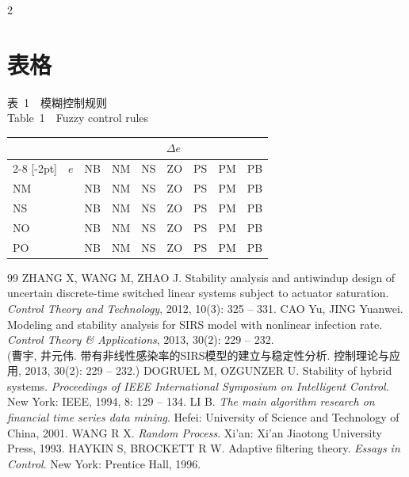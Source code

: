 \begin{multicols}{2}
\section{表格}
\begin{center}
{ 表~1~~模糊控制规则\\
Table~1~~Fuzzy control rules}\\
\label{tab:1} \vskip 3pt
\newcommand{\rb}[1]{\raisebox{1.9ex}[-2pt]{#1}}
{\fontsize{9.3pt}{11.6pt}\selectfont
\begin{tabular}{@{ }lllllllr@{ }}\toprule
&\multicolumn{7}{c}{$\Delta e$}\\
\cmidrule(l){2-8} \rb{~~$e$} & NB & NM & NS & ZO & PS & PM &
PB\\\midrule
NM & NB & NM & NS & ZO & PS & PM & PB\\
NS & NB & NM & NS & ZO & PS & PM & PB\\
NO & NB & NM & NS & ZO & PS & PM & PB\\
PO & NB & NM & NS & ZO & PS & PM & PB\\
\bottomrule
\end{tabular}}\end{center}
\vskip 12pt
 {\fontsize{7.8pt}{9.4pt}\selectfont
\begin{thebibliography}{99} \vskip 7pt
\setlength{\parskip}{-2pt}  %
ZHANG X,  WANG M, ZHAO J. Stability analysis and antiwindup design of
uncertain discrete-time switched linear systems subject to actuator
saturation. {\it  Control Theory and Technology},
2012, 10(3): 325 -- 331.
CAO Yu, JING Yuanwei. Modeling and stability analysis for SIRS
model with nonlinear infection rate. {\it Control Theory \&
Applications}, 2013, 30(2): 229 -- 232.\\
(曹宇, 井元伟.
带有非线性感染率的SIRS模型的建立与稳定性分析. 控制理论与应用,
2013, 30(2): 229 -- 232.)
DOGRUEL M, OZGUNZER U. Stability of hybrid systems. \textit{Proceedings of IEEE International Symposium on Intelligent
Control}. New York: IEEE, 1994, 8: 129 -- 134.
LI B. \textit{The main algorithm research on financial time
series data mining}. Hefei: University of Science and Technology
of China, 2001.
WANG R X. \textit{Random Process}. Xi'an: Xi'an Jiaotong University
Press, 1993.
HAYKIN S, BROCKETT R W. Adaptive filtering theory. \textit{Essays in Control}. New York: Prentice Hall, 1996.

\end{thebibliography}}
\end{multicols}
